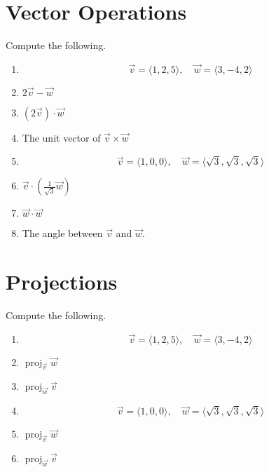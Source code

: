 \documentclass[letterpaper, 11pt]{article}
\DeclareMathOperator*{\proj}{proj}
\begin{document}
\section{Vector Operations}
Compute the following.
\begin{enumerate}[label=(\alph*)]
\item[] \[ \vec v = \langle 1,2,5 \rangle, \quad \vec w = \langle 3, -4, 2 \rangle \]

\item $2 \vec v  - \vec w$

\item $(2\vec v) \cdot \vec w$

\item The unit vector of $\vec v \times \vec w$

\item[] \[ \vec v = \langle 1,0,0 \rangle, \quad \vec w = \langle \sqrt{3}, \sqrt{3},\sqrt{3} \rangle \]

\item $\vec v \cdot \left( \frac{1}{\sqrt{3}} \vec w \right)$

\item $\vec w \cdot \vec w$

\item The angle between $\vec v$ and $\vec w$. 


\end{enumerate}

\section{Projections}
Compute the following.
\begin{enumerate}[label=(\alph*)]
\item[] \[ \vec v = \langle 1,2,5 \rangle, \quad \vec w = \langle 3, -4, 2 \rangle \]

\item $\proj_{\vec v} \vec w$

\item $\proj_{\vec w} \vec v$

\item[] \[ \vec v = \langle 1,0,0 \rangle, \quad \vec w = \langle \sqrt{3}, \sqrt{3},\sqrt{3} \rangle \]

\item $\proj_{\vec v} \vec w$

\item $\proj_{\vec w} \vec v$

\end{enumerate}
\end{document}
